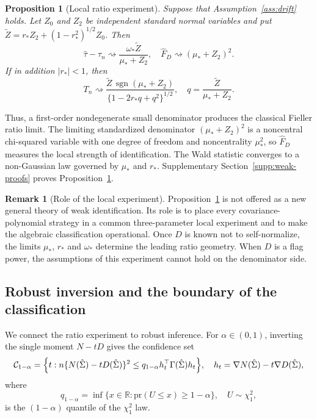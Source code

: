\documentclass[12pt,a4paper]{article}
\theoremstyle{plain}
\newtheorem{proposition}{Proposition}
\theoremstyle{definition}
\newtheorem{remark}{Remark}
\newcommand{\R}{\mathbb{R}}
\newcommand{\CS}{\mathcal{C}}
\newcommand{\sgn}{\operatorname{sgn}}
\newcommand{\dto}{\rightsquigarrow}
\newcommand{\pr}{\mathrm{pr}}
\newcommand{\Sighat}{\hat{\Sigma}}
\newcommand{\FD}{\widehat{F}_D}
\begin{document}
\begin{proposition}[Local ratio experiment]
\label{prop:transfer}
    Suppose that Assumption~\ref{ass:drift} holds.
    Let $Z_0$ and $Z_2$ be independent standard normal variables and put $\tilde{Z}=r_\ast Z_2+(1-r_\ast^2)^{1/2}Z_0$.
    Then
    \begin{equation}
    \label{eq:ratio-limit}
        \hat{\tau}-\tau_n
        \dto
        \frac{\omega_\ast\tilde{Z}}{\mu_\ast+Z_2}
        ,\quad
        \FD
        \dto
        (\mu_\ast+Z_2)^2
        .
    \end{equation}
    If in addition $|r_\ast|<1$, then
    \begin{equation}
    \label{eq:wald-limit}
        T_n
        \dto
        \frac{\tilde{Z}\,\sgn(\mu_\ast+Z_2)}
        {\{1-2r_\ast q+q^2\}^{1/2}}
        ,\quad
        q
        =
        \frac{\tilde{Z}}{\mu_\ast+Z_2}
        .
    \end{equation}
\end{proposition}
Thus, a first-order nondegenerate small denominator produces the classical Fieller ratio limit.
The limiting standardized denominator $(\mu_\ast+Z_2)^2$ is a noncentral chi-squared variable with one degree of freedom and noncentrality $\mu_\ast^2$, so $\FD$ measures the local strength of identification.
The Wald statistic converges to a non-Gaussian law governed by $\mu_\ast$ and $r_\ast$.
Supplementary Section~\ref{supp:weak-proofs} proves Proposition~\ref{prop:transfer}.

\begin{remark}[Role of the local experiment]
\label{rem:transfer-role}
    Proposition~\ref{prop:transfer} is not offered as a new general theory of weak identification.
    Its role is to place every covariance-polynomial strategy in a common three-parameter local experiment and to make the algebraic classification operational.
    Once $D$ is known not to self-normalize, the limits $\mu_\ast$, $r_\ast$ and $\omega_\ast$ determine the leading ratio geometry.
    When $D$ is a flag power, the assumptions of this experiment cannot hold on the denominator side.
\end{remark}

\subsection{Robust inversion and the boundary of the classification}

We connect the ratio experiment to robust inference.
For $\alpha\in(0,1)$, inverting the single moment $N-tD$ gives the confidence set
\begin{equation}
\label{eq:fieller-set}
    \CS_{1-\alpha}
    =
    \Bigl\{
        t:n\{N(\Sighat)-tD(\Sighat)\}^2
        \le
        q_{1-\alpha}h_t^\top\Gamma(\Sighat)h_t
    \Bigr\}
    ,
    \quad
    h_t
    =
    \nabla N(\Sighat)-t\nabla D(\Sighat)
    ,
\end{equation}
where
\begin{equation*}
    q_{1-\alpha}
    =
    \inf\{x\in\R:\pr(U\le x)\ge1-\alpha\}
    ,
    \quad
    U\sim\chi_1^2
    ,
\end{equation*}
is the $(1-\alpha)$ quantile of the $\chi_1^2$ law.
\end{document}
